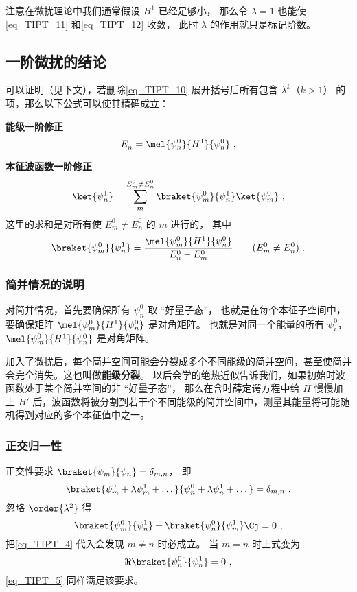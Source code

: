 注意在微扰理论中我们通常假设 $H^1$ 已经足够小， 那么令 $\lambda = 1$ 也能使\autoref{eq_TIPT_11} 和\autoref{eq_TIPT_12} 收敛， 此时 $\lambda$ 的作用就只是标记阶数。

\subsection{一阶微扰的结论}
可以证明（见下文），若删除\autoref{eq_TIPT_10} 展开括号后所有包含 $\lambda^k$（$k>1$） 的项，那么以下公式可以使其精确成立：

\textbf{能级一阶修正}
\begin{equation}\label{eq_TIPT_6}
E_n^1 = \mel{\psi_n^0}{H^1}{\psi_n^0}~,
\end{equation}

\textbf{本征波函数一阶修正}
\begin{equation}\label{eq_TIPT_5}
\ket{\psi_n^1} = \sum_m^{E_m^0 \ne E_n^0} \braket{\psi_m^0}{\psi_n^1} \ket{\psi_m^0}~,
\end{equation}
这里的求和是对所有使 $E_m^0 \ne E_n^0$ 的 $m$ 进行的， 其中
\begin{equation}\label{eq_TIPT_4}
\braket{\psi_m^0}{\psi_n^1} = \frac{\mel{\psi_m^0}{H^1}{\psi_n^0}}{E_n^0 - E_m^0} \qquad (E_m^0 \ne E_n^0)~.
\end{equation}

\subsubsection{简并情况的说明}
对简并情况，首先要确保所有 $\psi_n^0$ 取 “好量子态”， 也就是在每个本征子空间中， 要确保矩阵 $\mel{\psi_m^0}{H^1}{\psi_n^0}$ 是对角矩阵。 也就是对同一个能量的所有 $\psi_i^0$， $\mel{\psi_m^0}{H^1}{\psi_n^0}$ 是对角矩阵。

加入了微扰后，每个简并空间可能会分裂成多个不同能级的简并空间，甚至使简并会完全消失。这也叫做\textbf{能级分裂}。 以后会学的绝热近似告诉我们，如果初始时波函数处于某个简并空间的非 “好量子态”， 那么在含时薛定谔方程中给 $H$ 慢慢加上 $H'$ 后，波函数将被分割到若干个不同能级的简并空间中，测量其能量将可能随机得到对应的多个本征值中之一。

\subsubsection{正交归一性}
正交性要求 $\braket{\psi_m}{\psi_n} = \delta_{m,n}$， 即
\begin{equation}\label{eq_TIPT_7}
\braket{\psi_m^0 + \lambda \psi_m^1 + \dots}{\psi_n^0 + \lambda \psi_n^1 + \dots} = \delta_{m,n}~.
\end{equation}
忽略 $\order{\lambda^2}$ 得
\begin{equation}\label{eq_TIPT_8}
\braket{\psi_m^0}{\psi_n^1} + \braket{\psi_n^0}{\psi_m^1}\Cj = 0~,
\end{equation}
把\autoref{eq_TIPT_4} 代入会发现 $m \ne n$ 时必成立。 当 $m = n$ 时上式变为
\begin{equation}
\Re{\braket{\psi_n^0}{\psi_n^1}} = 0~,
\end{equation}
\autoref{eq_TIPT_5} 同样满足该要求。

